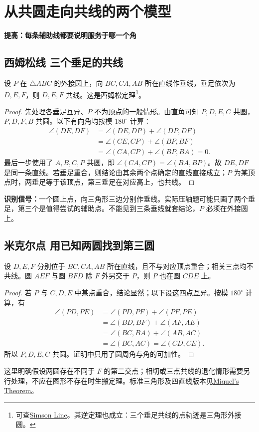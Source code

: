 \documentclass[lang=cn,12pt,fontset=none,a4paper,openany]{beautybook}
\newcommand{\level}[1]{\par\smallskip\noindent\textcolor{coverfgcolor}{\textbf{#1}}\quad}
\begin{document}
\chapter{从共圆走向共线的两个模型}
\level{提高：每条辅助线都要说明服务于哪一个角}
\section{西姆松线 三个垂足的共线}
设 $P$ 在 $\triangle ABC$ 的外接圆上，向 $BC,CA,AB$ 所在直线作垂线，垂足依次为 $D,E,F$，则 $D,E,F$ 共线。这是西姆松定理\footnote{可查\href{https://mathworld.wolfram.com/SimsonLine.html}{Simson Line}。其逆定理也成立：三个垂足共线的点轨迹是三角形外接圆。}。
\begin{proof}
先处理各垂足互异、$P$ 不为顶点的一般情形。由直角可知 $P,D,E,C$ 共圆，$P,D,F,B$ 共圆。以下有向角均按模 $180^\circ$ 计算：
\begin{align*}
 \angle(DE,DF)
 &=\angle(DE,DP)+\angle(DP,DF)\\
 &=\angle(CE,CP)+\angle(BP,BF)\\
 &=\angle(CA,CP)+\angle(BP,BA)=0.
\end{align*}
最后一步使用了 $A,B,C,P$ 共圆，即 $\angle(CA,CP)=\angle(BA,BP)$。故 $DE,DF$ 是同一条直线。若垂足重合，则结论由其余两个点确定的直线直接成立；$P$ 为某顶点时，两垂足等于该顶点，第三垂足在对应高上，也共线。
\end{proof}
\textbf{识别信号：}一个圆上点，向三角形三边分别作垂线。实际压轴题可能只画了两个垂足，第三个是值得尝试的辅助点。不能见到三条垂线就套结论，$P$ 必须在外接圆上。

\section{米克尔点 用已知两圆找到第三圆}
设 $D,E,F$ 分别位于 $BC,CA,AB$ 所在直线，且不与对应顶点重合；相关三点均不共线。圆 $AEF$ 与圆 $BFD$ 除 $F$ 外另交于 $P$，则 $P$ 也在圆 $CDE$ 上。
\begin{proof}
若 $P$ 与 $C,D,E$ 中某点重合，结论显然；以下设这四点互异。按模 $180^\circ$ 计算，有
\begin{align*}
 \angle(PD,PE)
 &=\angle(PD,PF)+\angle(PF,PE)\\
 &=\angle(BD,BF)+\angle(AF,AE)\\
 &=\angle(BC,BA)+\angle(AB,AC)\\
 &=\angle(BC,AC)=\angle(CD,CE).
\end{align*}
所以 $P,D,E,C$ 共圆。证明中只用了圆周角与角的可加性。
\end{proof}
这里明确假设两圆存在不同于 $F$ 的第二交点；相切或三点共线的退化情形需要另行处理，不应在图形不存在时生搬定理。标准三角形及四直线版本见\href{https://mathworld.wolfram.com/MiquelsTheorem.html}{Miquel's Theorem}。
\end{document}
